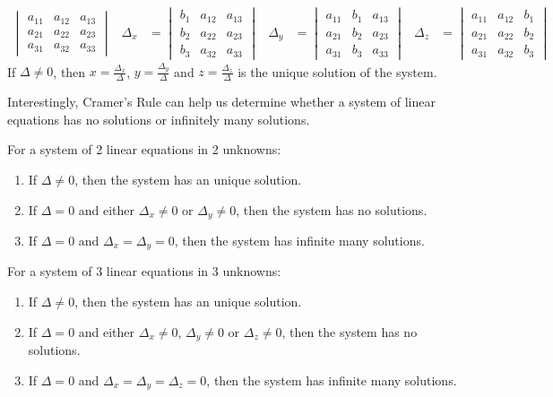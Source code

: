 \documentclass{huhtakm-template-book}
\begin{document}
\begin{thm}
\begin{align*}
\begin{vmatrix}
            a_{11} & a_{12} & a_{13}\\
            a_{21} & a_{22} & a_{23}\\
            a_{31} & a_{32} & a_{33}
        \end{vmatrix} & \Delta_{x}&=\begin{vmatrix}
            b_{1} & a_{12} & a_{13}\\
            b_{2} & a_{22} & a_{23}\\
            b_{3} & a_{32} & a_{33}
        \end{vmatrix} & \Delta_{y}&=\begin{vmatrix}
            a_{11} & b_{1} & a_{13}\\
            a_{21} & b_{2} & a_{23}\\
            a_{31} & b_{3} & a_{33}
        \end{vmatrix} & \Delta_{z}&=\begin{vmatrix}
            a_{11} & a_{12} & b_{1}\\
            a_{21} & a_{22} & b_{2}\\
            a_{31} & a_{32} & b_{3}
        \end{vmatrix}
    \end{align*}
    If $\Delta\neq 0$, then $x=\frac{\Delta_{x}}{\Delta}$, $y=\frac{\Delta_{y}}{\Delta}$ and $z=\frac{\Delta_{z}}{\Delta}$ is the unique solution of the system.
\end{thm}
\newpage
Interestingly, Cramer's Rule can help us determine whether a system of linear equations has no solutions or infinitely many solutions.
\begin{thm}
    For a system of 2 linear equations in 2 unknowns:
    \begin{enumerate}
        \item If $\Delta\neq 0$, then the system has an unique solution.
        \item If $\Delta=0$ and either $\Delta_{x}\neq 0$ or $\Delta_{y}\neq 0$, then the system has no solutions.
        \item If $\Delta=0$ and $\Delta_{x}=\Delta_{y}=0$, then the system has infinite many solutions.
    \end{enumerate}
    For a system of 3 linear equations in 3 unknowns:
    \begin{enumerate}
        \item If $\Delta\neq 0$, then the system has an unique solution.
        \item If $\Delta=0$ and either $\Delta_{x}\neq 0$, $\Delta_{y}\neq 0$ or $\Delta_{z}\neq 0$, then the system has no solutions.
        \item If $\Delta=0$ and $\Delta_{x}=\Delta_{y}=\Delta_{z}=0$, then the system has infinite many solutions.
    \end{enumerate}
\end{thm}
\end{document}

